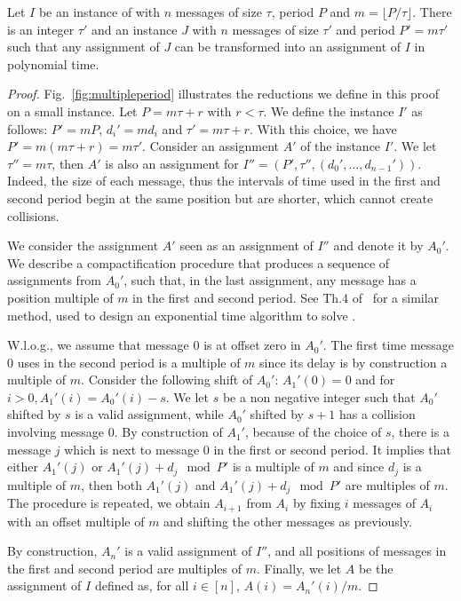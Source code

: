 \documentclass[pdflatex,sn-mathphys,iicol]{sn-jnl}%
\theoremstyle{thmstyleone}%
\theoremstyle{thmstyletwo}%
\theoremstyle{thmstylethree}%
\begin{document}
\begin{lemma}\label{lemma:multiple}
Let $I$ be an instance of \pma with $n$ messages of size $\tau$, period $P$ and $m = \lfloor P / \tau \rfloor$. There is an integer $\tau'$ and an instance $J$ with $n$ messages of size $\tau'$ and period $P'= m\tau'$ such that any assignment of $J$ can be transformed into an assignment of $I$ in polynomial time.
\end{lemma}
\begin{proof}
Fig.~\ref{fig:multipleperiod} illustrates the reductions we define in this proof on a small instance.
Let $P = m \tau + r$ with $r < \tau$. We define the instance $I'$ as follows: $P' = mP$, $d_{i}' = m d_i$ and $\tau' = m \tau + r$. With this choice, we have $P' = m(m \tau + r) = m \tau'$.
Consider an assignment $A'$ of the instance $I'$. We let $\tau'' = m\tau$, then $A'$ is also an assignment for $I'' = (P',\tau'',(d_{0}',\dots,d_{n-1}'))$. Indeed, the size of each message, thus the intervals of time used in the first and second period begin at the same position but are shorter, which cannot create collisions. 

We consider the assignment $A'$ seen as an assignment of $I''$ and denote it by $A_0'$.
We describe a compactification procedure that produces a sequence of assignments from $A_0'$, such that, in the last assignment, any message has a position multiple of $m$ in the first and second period. See Th.4 of~\cite{bartharxiv2018deterministic} for a similar method, used to design an exponential time algorithm to solve \pma. 

W.l.o.g., we assume that message $0$ is at offset zero in $A_0'$. The first time message $0$ uses in the second period is a multiple of $m$ since its delay is by construction a multiple of $m$. Consider the following shift of $A_0'$: $A_1'(0) = 0$ and for $i>0, A_1'(i) = A_0'(i) - s$. We let $s$ be a non negative integer such that $A_0'$ shifted by $s$ is a valid assignment, while $A_0'$ shifted by $s+1$ has a collision involving message $0$. By construction of $A_1'$, because of the choice of $s$, there is a message $j$ which is next to message $0$ in the first or second period. It implies that either $A_1'(j)$ or $A_1'(j)+d_j \mod P'$ is a multiple of $m$ and since $d_j$ is a multiple of $m$, then both $A_1'(j)$ and $A_1'(j)+d_j \mod P'$ are multiples of $m$. The procedure is repeated, we obtain $A_{i+1}$ from $A_i$ by fixing $i$ messages of $A_i$ with an offset multiple of $m$ and shifting the other messages as previously. 

By construction, $A_n'$ is a valid assignment of $I''$, and all positions of messages in the first and second period are multiples of $m$. Finally, we let $A$ be the assignment of $I$ defined as, for all $i \in [n]$, $A(i) = A_n'(i)/m$. 
\end{proof}
\end{document}
